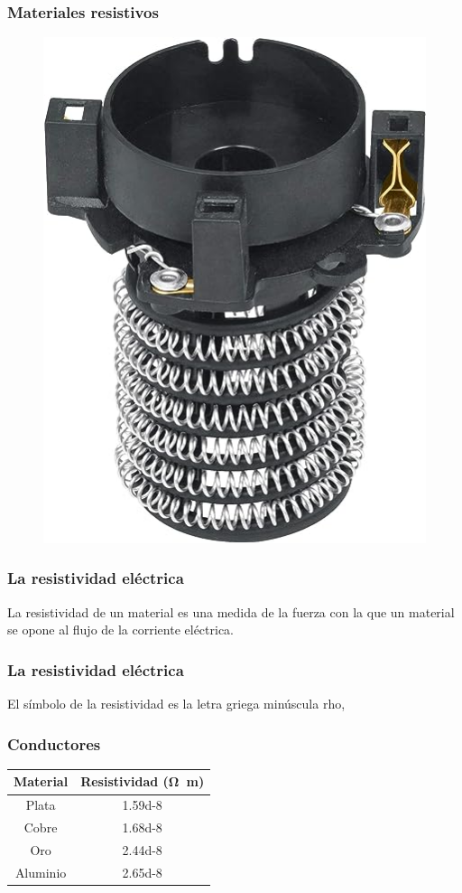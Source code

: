 \documentclass[14pt]{beamer}
\begin{document}
\begin{frame}
\frametitle{Materiales resistivos}
\begin{figure}
    \centering
    \includegraphics[scale=0.3]{Imagenes/Materiales_Conductores_02.jpg}
\end{figure}
\end{frame}
\begin{frame}
\frametitle{La resistividad eléctrica}
La resistividad de un material es una medida de la fuerza con la que un material se opone al flujo de la corriente eléctrica.
\end{frame}
\begin{frame}
\frametitle{La resistividad eléctrica}
El símbolo de la resistividad es la letra griega minúscula rho,
\end{frame}
\begin{frame}
\frametitle{Conductores}
\vspace*{-1cm}
\begin{table}
\setlength{\tabcolsep}{1pt}
\centering
\begin{tabular}{c | c}
Material & Resistividad (\si{\ohm\meter}) \\ \hline
Plata & \num{1.59d-8} \\ \hline
Cobre & \num{1.68d-8} \\ \hline
Oro & \num{2.44d-8} \\ \hline
Aluminio & \num{2.65d-8} \\ \hline
\end{tabular}
\end{table}
\end{frame}
    
\end{document}
